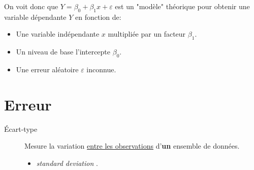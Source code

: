 \documentclass[10pt, french]{article}
\begin{document}
\begin{multicols*}{2}
\begin{tikzpicture}[x=0.75pt,y=0.75pt,yscale=-1,xscale=1]
\end{tikzpicture}

On voit donc que $Y = \beta_{0} + \beta_{1} x + \varepsilon$ est un "modèle" théorique pour obtenir une variable dépendante $Y$ en fonction de: 
\begin{itemize}
	\item	Une variable indépendante $x$ multipliée par un facteur $\beta_{1}$.
	\item	Un niveau de base l'intercepte $\beta_{0}$.
	\item	Une erreur aléatoire $\varepsilon$ inconnue.
\end{itemize}

\section{Erreur}

\begin{description}
	\item[Écart-type]	Mesure la variation \underline{entre les observations} d'\textbf{un} ensemble de données.
		\begin{itemize}[leftmargin = *]
		\item	\og \textit{standard deviation} \fg{}.
		\end{itemize}
		\begin{center}


\begin{tikzpicture}[x=0.75pt,y=0.75pt,yscale=-1,xscale=1]


\end{tikzpicture}
\end{center}
\end{description}
\end{multicols*}
\end{document}
